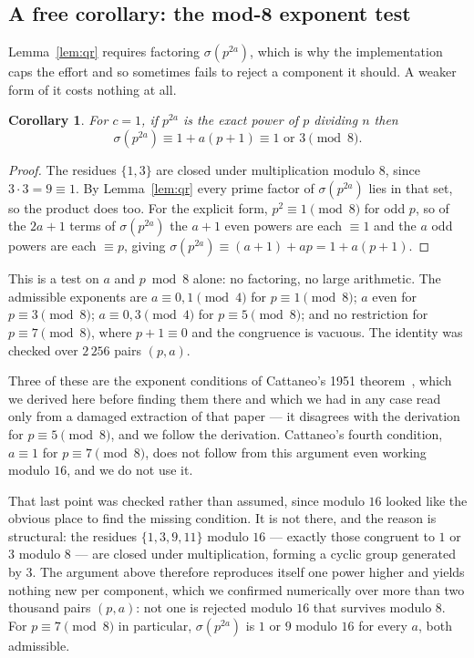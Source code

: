 \documentclass[11pt]{amsart}
\newtheorem{corollary}[theorem]{Corollary}
\theoremstyle{remark}
\begin{document}
\subsection{A free corollary: the mod-8 exponent test}\label{sec:mod8}
Lemma~\ref{lem:qr} requires factoring $\sigma(p^{2a})$, which is why the
implementation caps the effort and so sometimes fails to reject a component it
should. A weaker form of it costs nothing at all.

\begin{corollary}\label{cor:mod8}
For $c = 1$, if $p^{2a}$ is the exact power of $p$ dividing $n$ then
\[
  \sigma(p^{2a}) \equiv 1 + a(p+1) \equiv 1 \text{ or } 3 \pmod 8 .
\]
\end{corollary}
\begin{proof}
The residues $\{1,3\}$ are closed under multiplication modulo $8$, since
$3 \cdot 3 = 9 \equiv 1$. By Lemma~\ref{lem:qr} every prime factor of
$\sigma(p^{2a})$ lies in that set, so the product does too. For the explicit
form, $p^{2} \equiv 1 \pmod 8$ for odd $p$, so of the $2a+1$ terms of
$\sigma(p^{2a})$ the $a+1$ even powers are each $\equiv 1$ and the $a$ odd powers
are each $\equiv p$, giving $\sigma(p^{2a}) \equiv (a+1) + ap = 1 + a(p+1)$.
\end{proof}

This is a test on $a$ and $p \bmod 8$ alone: no factoring, no large arithmetic.
The admissible exponents are $a \equiv 0, 1 \pmod 4$ for $p \equiv 1 \pmod 8$;
$a$ even for $p \equiv 3 \pmod 8$; $a \equiv 0, 3 \pmod 4$ for
$p \equiv 5 \pmod 8$; and no restriction for $p \equiv 7 \pmod 8$, where
$p + 1 \equiv 0$ and the congruence is vacuous. The identity was checked over
$2\,256$ pairs $(p, a)$.

Three of these are the exponent conditions of Cattaneo's 1951
theorem~\cite{cattaneo}, which we derived here before finding them there and which
we had in any case read only from a damaged extraction of that paper --- it
disagrees with the derivation for $p \equiv 5 \pmod 8$, and we follow the
derivation. Cattaneo's fourth condition, $a \equiv 1$ for $p \equiv 7 \pmod 8$,
does not follow from this argument even working modulo $16$, and we do not use
it.

That last point was checked rather than assumed, since modulo $16$ looked like
the obvious place to find the missing condition. It is not there, and the reason
is structural: the residues $\{1, 3, 9, 11\}$ modulo $16$ --- exactly those
congruent to $1$ or $3$ modulo $8$ --- are closed under multiplication, forming
a cyclic group generated by $3$. The argument above therefore reproduces itself
one power higher and yields nothing new per component, which we confirmed
numerically over more than two thousand pairs $(p, a)$: not one is rejected
modulo $16$ that survives modulo $8$. For $p \equiv 7 \pmod 8$ in particular,
$\sigma(p^{2a})$ is $1$ or $9$ modulo $16$ for every $a$, both admissible.
\end{document}
